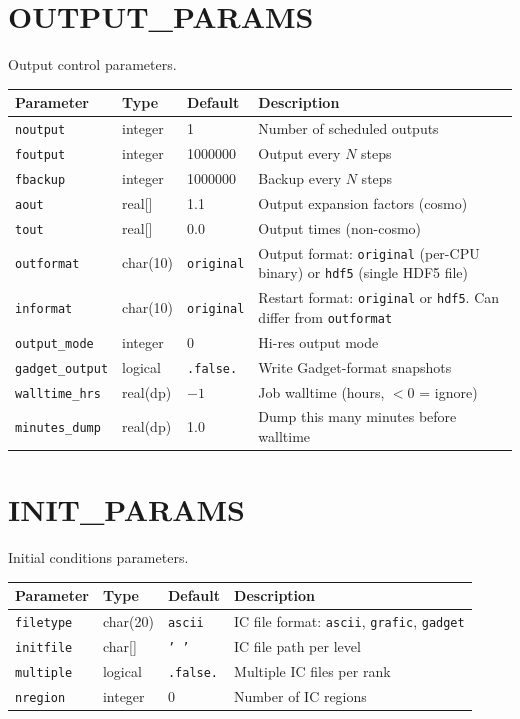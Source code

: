 \documentclass[11pt,fleqn]{book}
\begin{document}
\chapter{OUTPUT\_PARAMS}

Output control parameters.

\begin{longtable}{L{3.5cm} C{1.8cm} C{1.8cm} L{6cm}}
\toprule
\textbf{Parameter} & \textbf{Type} & \textbf{Default} & \textbf{Description} \\
\midrule
\endhead
\texttt{noutput} & integer & 1 & Number of scheduled outputs \\
\texttt{foutput} & integer & 1000000 & Output every $N$ steps \\
\texttt{fbackup} & integer & 1000000 & Backup every $N$ steps \\
\texttt{aout} & real[] & 1.1 & Output expansion factors (cosmo) \\
\texttt{tout} & real[] & 0.0 & Output times (non-cosmo) \\
\texttt{outformat} & char(10) & \texttt{original} & Output format: \texttt{original} (per-CPU binary) or \texttt{hdf5} (single HDF5 file) \\
\texttt{informat} & char(10) & \texttt{original} & Restart format: \texttt{original} or \texttt{hdf5}. Can differ from \texttt{outformat} \\
\texttt{output\_mode} & integer & 0 & Hi-res output mode \\
\texttt{gadget\_output} & logical & \texttt{.false.} & Write Gadget-format snapshots \\
\texttt{walltime\_hrs} & real(dp) & $-1$ & Job walltime (hours, $<0$ = ignore) \\
\texttt{minutes\_dump} & real(dp) & 1.0 & Dump this many minutes before walltime \\
\bottomrule
\end{longtable}


\chapter{INIT\_PARAMS}

Initial conditions parameters.

\begin{longtable}{L{3.5cm} C{1.8cm} C{1.8cm} L{6cm}}
\toprule
\textbf{Parameter} & \textbf{Type} & \textbf{Default} & \textbf{Description} \\
\midrule
\endhead
\texttt{filetype} & char(20) & \texttt{ascii} & IC file format: \texttt{ascii}, \texttt{grafic}, \texttt{gadget} \\
\texttt{initfile} & char[] & \texttt{' '} & IC file path per level \\
\texttt{multiple} & logical & \texttt{.false.} & Multiple IC files per rank \\
\texttt{nregion} & integer & 0 & Number of IC regions \\
\bottomrule
\end{longtable}
\end{document}
